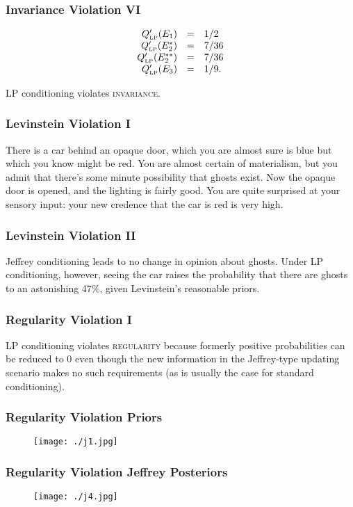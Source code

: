 \documentclass[xcolor=dvipsnames]{beamer}
\begin{document}
\begin{frame}
  \frametitle{Invariance Violation VI}
\begin{equation}
  \label{eq:marpleposteriorlp}
  \begin{array}{rcl}
  Q'_{\mbox{\tiny LP}}(E_{1})&=&1/2\\
  Q'_{\mbox{\tiny LP}}(E_{2}^{*})&=&7/36\\
  Q'_{\mbox{\tiny LP}}(E_{2}^{**})&=&7/36\\
  Q'_{\mbox{\tiny LP}}(E_{3})&=&1/9.
\end{array}
\end{equation}

LP conditioning violates \textsc{invariance}.
\end{frame}

\begin{frame}
  \frametitle{Levinstein Violation I}
  There is a car behind an opaque door, which you are almost sure is
  blue but which you know might be red. You are almost certain of
  materialism, but you admit that there's some minute possibility that
  ghosts exist. Now the opaque door is opened, and the lighting is
  fairly good. You are quite surprised at your sensory input: your new
  credence that the car is red is very high.
\end{frame}

\begin{frame}
  \frametitle{Levinstein Violation II}
  Jeffrey conditioning leads to no change in opinion about ghosts.
  Under LP conditioning, however, seeing the car raises the
  probability that there are ghosts to an astonishing 47\%, given
  Levinstein's reasonable priors.
\end{frame}

\begin{frame}
  \frametitle{Regularity Violation I}
  LP conditioning violates \textsc{regularity} because formerly
  positive probabilities can be reduced to $0$ even though the new
  information in the Jeffrey-type updating scenario makes no such
  requirements (as is usually the case for standard conditioning).
\end{frame}

\begin{frame}
  \frametitle{Regularity Violation Priors}
  \begin{figure}[h]
    \texttt{[image: ./j1.jpg]}
  \end{figure}
\end{frame}

\begin{frame}
  \frametitle{Regularity Violation Jeffrey Posteriors}
  \begin{figure}[h]
    \texttt{[image: ./j4.jpg]}
  \end{figure}
\end{frame}
\end{document}

